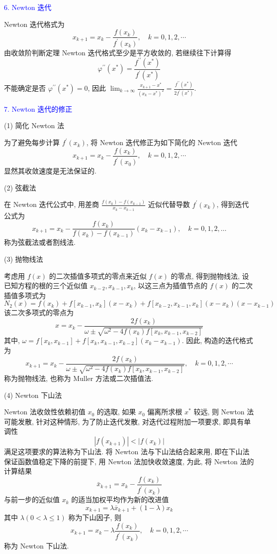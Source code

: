 \textcolor{blue}{6. Newton 迭代}

Newton 迭代格式为
$$
x_{k+1}=x_{k}-\frac{f\left(x_{k}\right)}{f^{\prime}\left(x_{k}\right)}, \quad k=0,1,2, \cdots
$$
由收敛阶判断定理 Newton 迭代格式至少是平方收敛的, 若继续往下计算得
$$
\varphi^{\prime \prime}\left(x^{*}\right)=\frac{f^{\prime \prime}\left(x^{*}\right)}{f^{\prime}\left(x^{*}\right)}
$$
不能确定是否 $ \varphi^{\prime \prime}\left(x^{*}\right)=0 $, 因此 $\displaystyle \lim _{k \rightarrow \infty} \frac{x_{k+1}-x^{*}}{\left(x_{k}-x^{*}\right)^{2}}=\frac{f^{\prime \prime}\left(x^{*}\right)}{2 f^{\prime}\left(x^{*}\right)} $.

\textcolor{blue}{7. Newton 迭代的修正}

(1) 简化 Newton 法

为了避免每步计算 $ f^{\prime}\left(x_{k}\right) $, 将 Newton 迭代修正为如下简化的 Newton 迭代
$$
x_{k+1}=x_{k}-\frac{f\left(x_{k}\right)}{f^{\prime}\left(x_{0}\right)}, \quad k=0,1,2, \cdots
$$
显然其收敛速度是无法保证的.

(2) 弦截法

在 Newton 迭代公式中, 用差商 $ \frac{f\left(x_{k}\right)-f\left(x_{k-1}\right)}{x_{k}-x_{k-1}} $ 近似代替导数 $ f^{\prime}\left(x_{k}\right) $, 得到迭代公式为
$$
x_{k+1}=x_{k}-\frac{f\left(x_{k}\right)}{f\left(x_{k}\right)-f\left(x_{k-1}\right)}\left(x_{k}-x_{k-1}\right), \quad k=0,1,2, \ldots
$$
称为弦截法或者割线法.

(3) 抛物线法

考虑用 $ f(x) $ 的二次插值多项式的零点来近似 $ f(x) $ 的零点, 得到抛物线法, 设已知方程的根的三个近似值 $ x_{k-2}, x_{k-1}, x_{k} $, 以这三点为插值节点的 $ f(x) $ 的二次插值多项式为
$$
N_{2}(x)=f\left(x_{k}\right)+f\left[x_{k-1}, x_{k}\right]\left(x-x_{k}\right)+f\left[x_{k-2}, x_{k-1}, x_{k}\right]\left(x-x_{k}\right)\left(x-x_{k-1}\right)
$$
该二次多项式的零点为
$$
x=x_{k}-\frac{2 f\left(x_{k}\right)}{\omega \pm \sqrt{\omega^{2}-4 f\left(x_{k}\right) f\left[x_{k}, x_{k-1}, x_{k-2}\right]}}
$$
其中, $ \omega=f\left[x_{k}, x_{k-1}\right]+f\left[x_{k}, x_{k-1}, x_{k-2}\right]\left(x_{k}-x_{k-1}\right) $.
因此, 构造的迭代格式为
$$
x_{k+1}=x_{k}-\frac{2 f\left(x_{k}\right)}{\omega \pm \sqrt{\omega^{2}-4 f\left(x_{k}\right) f\left[x_{k}, x_{k-1}, x_{k-2}\right]}}, \quad k=0,1,2, \cdots
$$
称为抛物线法, 也称为 Muller 方法或二次插值法.

(4) Newton 下山法

Newton 法收敛性依赖初值 $ x_{0} $ 的选取, 如果 $ x_{0} $ 偏离所求根 $ x^{*} $ 较远, 则 Newton 法可能发散, 针对这种情形, 为了防止迭代发散, 对迭代过程附加一项要求, 即具有单调性
$$
\left|f\left(x_{k+1}\right)\right|<\left|f\left(x_{k}\right)\right|
$$
满足这项要求的算法称为下山法. 将 Newton 法与下山法结合起来用, 即在下山法保证函数值稳定下降的前提下, 用 Newton 法加快收敛速度, 为此, 将 Newton 法的计算结果
$$
\bar{x}_{k+1}=x_{k}-\frac{f\left(x_{k}\right)}{f^{\prime}\left(x_{k}\right)}
$$
与前一步的近似值 $ x_{k} $ 的适当加权平均作为新的改进值
$$
x_{k+1}=\lambda \bar{x}_{k+1}+(1-\lambda) x_{k}
$$
其中 $ \lambda(0<\lambda \leqslant 1) $ 称为下山因子, 则
$$
x_{k+1}=x_{k}-\lambda \frac{f\left(x_{k}\right)}{f^{\prime}\left(x_{k}\right)}, \quad k=0,1,2, \cdots
$$
称为 Newton 下山法.

